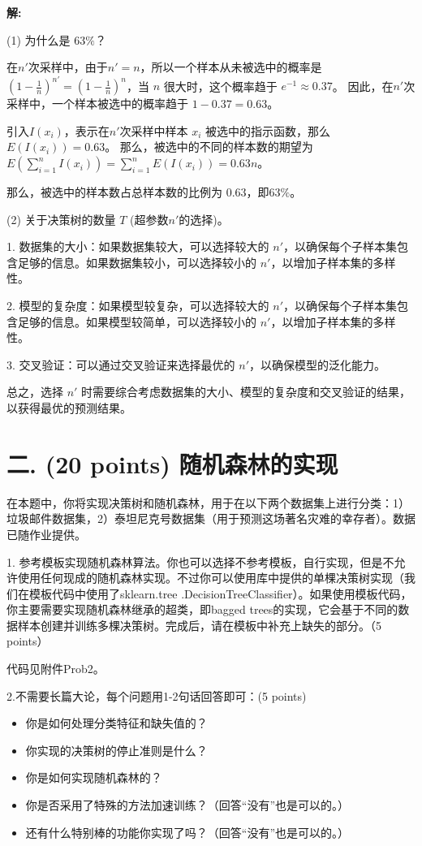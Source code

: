 \documentclass[8pt]{article}
\begin{document}
\textbf{\large 解:}

(1) 为什么是 $63\%$？

在$n'$次采样中，由于$n' = n$，所以一个样本从未被选中的概率是 $(1 - \frac{1}{n})^{n'} = (1 - \frac{1}{n})^{n}$，当 $n$ 很大时，这个概率趋于 $e^{-1} \approx 0.37$。
因此，在$n'$次采样中，一个样本被选中的概率趋于 $1 - 0.37 = 0.63$。

引入$I(x_i)$，表示在$n'$次采样中样本 $x_i$ 被选中的指示函数，那么 $E(I(x_i)) = 0.63$。
那么，被选中的不同的样本数的期望为$
E\left(\sum_{i=1}^{n}I(x_i)\right) 
= \sum_{i=1}^{n}E(I(x_i)) = 0.63n$。

那么，被选中的样本数占总样本数的比例为 $0.63$，即$63\%$。

(2) 关于决策树的数量 $T$ (超参数$n'$的选择)。

1. 数据集的大小：如果数据集较大，可以选择较大的 $n'$，以确保每个子样本集包含足够的信息。如果数据集较小，可以选择较小的 $n'$，以增加子样本集的多样性。

2. 模型的复杂度：如果模型较复杂，可以选择较大的 $n'$，以确保每个子样本集包含足够的信息。如果模型较简单，可以选择较小的 $n'$，以增加子样本集的多样性。

3. 交叉验证：可以通过交叉验证来选择最优的 $n'$，以确保模型的泛化能力。

总之，选择 $n'$ 时需要综合考虑数据集的大小、模型的复杂度和交叉验证的结果，以获得最优的预测结果。

\vspace{3em}


\section*{二. (20 points) 随机森林的实现}

在本题中，你将实现决策树和随机森林，用于在以下两个数据集上进行分类：1）垃圾邮件数据集，2）泰坦尼克号数据集（用于预测这场著名灾难的幸存者）。数据已随作业提供。

1. 参考模板实现随机森林算法。你也可以选择不参考模板，自行实现，但是不允许使用任何现成的随机森林实现。不过你可以使用库中提供的单棵决策树实现（我们在模板代码中使用了sklearn.tree .DecisionTreeClassifier）。如果使用模板代码，你主要需要实现随机森林继承的超类，即bagged trees的实现，它会基于不同的数据样本创建并训练多棵决策树。完成后，请在模板中补充上缺失的部分。（5 points）

{\color{blue} 代码见附件Prob2。}

2.不需要长篇大论，每个问题用1-2句话回答即可：(5 points)
\begin{itemize}
\item 你是如何处理分类特征和缺失值的？
\item 你实现的决策树的停止准则是什么？
\item 你是如何实现随机森林的？
\item 你是否采用了特殊的方法加速训练？（回答“没有”也是可以的。）
\item 还有什么特别棒的功能你实现了吗？（回答“没有”也是可以的。）
\end{itemize}
\end{document}
